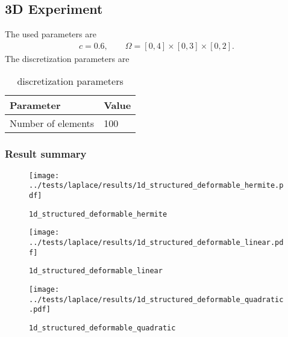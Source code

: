 \subsection{3D Experiment}
%
The used parameters are
\begin{equation*}
\begin{array}{lll}
  c = 0.6,\qquad \Omega = [0,4] \times [0,3] \times [0,2].
\end{array}
\end{equation*}
The discretization parameters are
\begin{table}[h!]
  \centering%
\begin{center}
  \begin{tabular}{l|l}
    \textbf{Parameter} & \textbf{Value}\\
    \hline
    Number of elements & 100\\
  \end{tabular}
\end{center}
\caption{discretization parameters}
\label{tab:table1}
\end{table}


\subsubsection{Result summary}
%
%

\begin{figure}[h!]
  \centering%
  \texttt{[image: ../tests/laplace/results/1d\_structured\_deformable\_hermite.pdf]}
  \caption{\lstinline{1d_structured_deformable_hermite}}
\end{figure} 




%

\begin{figure}[h!]
  \centering%
  \texttt{[image: ../tests/laplace/results/1d\_structured\_deformable\_linear.pdf]}
  \caption{\lstinline{1d_structured_deformable_linear}}
\end{figure} 




%

\begin{figure}[h!]
  \centering%
  \texttt{[image: ../tests/laplace/results/1d\_structured\_deformable\_quadratic.pdf]}
  \caption{\lstinline{1d_structured_deformable_quadratic}}
\end{figure} 


